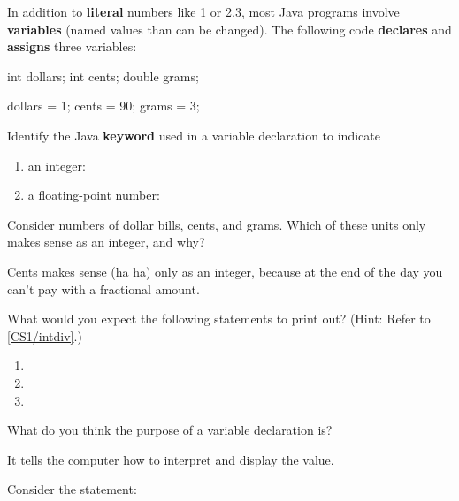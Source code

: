 
\label{CS1/vardecl}

In addition to \textbf{literal} numbers like 1 or 2.3, most Java programs involve \textbf{variables} (named values than can be changed).
The following code \textbf{declares} and \textbf{assigns} three variables:

\begin{javabox}
int dollars;
int cents;
double grams;

dollars = 1;
cents = 90;
grams = 3;
\end{javabox}



\Q Identify the Java \textbf{keyword} used in a variable declaration to indicate

\begin{enumerate}
\item an integer: 
\item a floating-point number: 
\end{enumerate}


\Q Consider numbers of dollar bills, cents, and grams. Which of these units only makes sense as an integer, and why?

\begin{answer}
Cents makes sense (ha ha) only as an integer, because at the end of the day you can't pay with a fractional amount.
\end{answer}


\Q What would you expect the following statements to print out? (Hint: Refer to \ref{CS1/intdiv}.)

\begin{enumerate}
\item {} 
\item {} 
\item {} 
\end{enumerate}


\Q What do you think the purpose of a variable declaration is?

\begin{answer}
It tells the computer how to interpret and display the value.
\end{answer}


\Q Consider the statement: ~ 


